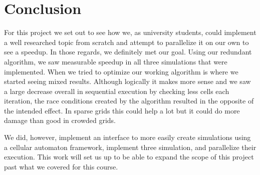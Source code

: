 \documentclass[12pt]{article}
\begin{document}
\section{Conclusion}
\par For this project we set out to see how we, as university students, could implement a well researched topic from scratch and attempt to parallelize it on our own to see a speedup. In those regards, we definitely met our goal. Using our redundant algorithm, we saw measurable speedup in all three simulations that were implemented. When we tried to optimize our working algorithm is where we started seeing mixed results. Although logically it makes more sense and we saw a large decrease overall in sequential execution by checking less cells each iteration, the race conditions created by the algorithm resulted in the opposite of the intended effect. In sparse grids this could help a lot but it could do more damage than good in crowded grids. 
\par We did, however, implement an interface to more easily create simulations using a cellular automaton framework, implement three simulation, and parallelize their execution. This work will set us up to be able to expand the scope of this project past what we covered for this course.



\end{document}
